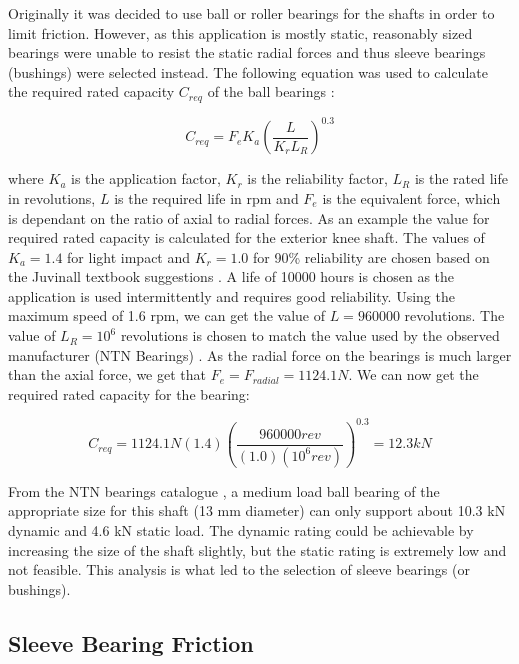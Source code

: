 Originally it was decided to use ball or roller bearings for the shafts in order to limit friction. However, as this application is mostly static, reasonably sized bearings were unable to resist the static radial forces and thus sleeve bearings (bushings) were selected instead. The following equation was used to calculate the required rated capacity $C_{req}$ of the ball bearings \cite{juvinall_fundamentals_2012}:

\begin{equation}
    C_{req}=F_e K_a( \frac{L}{K_r L_R})^{0.3}  
\end{equation}

where $K_a$ is the application factor, $K_r$ is the reliability factor, $L_R$ is the rated life in revolutions, $L$ is the required life in rpm and $F_e$ is the equivalent force, which is dependant on the ratio of axial to radial forces. As an example the value for required rated capacity is calculated for the exterior knee shaft. The values of $K_a=1.4$ for light impact and $K_r=1.0$ for 90\% reliability are chosen based on the Juvinall textbook suggestions \cite{juvinall_fundamentals_2012}. A life of 10000 hours is chosen as the application is used intermittently and requires good reliability. Using the maximum speed of 1.6 rpm, we can get the value of $L=960000$ revolutions. The value of $L_R=10^6$ revolutions is chosen to match the value used by the observed manufacturer (NTN Bearings) \cite{ntn_bearing_deep_nodate}. As the radial force on the bearings is much larger than the axial force, we get that $F_e=F_{radial}=1124.1 N$. We can now get the required rated capacity for the bearing:

\begin{equation}
    C_{req}=1124.1 N (1.4)( \frac{960000 rev}{(1.0) (10^6 rev)})^{0.3}= 12.3 kN
\end{equation}

From the NTN bearings catalogue \cite{ntn_bearing_deep_nodate}, a medium load ball bearing of the appropriate size for this shaft (13 mm diameter) can only support about 10.3 kN dynamic and 4.6 kN static load. The dynamic rating could be achievable by increasing the size of the shaft slightly, but the static rating is extremely low and not feasible. This analysis is what led to the selection of sleeve bearings (or bushings).


\subsection{Sleeve Bearing Friction} \label{app:bearing_friction}

